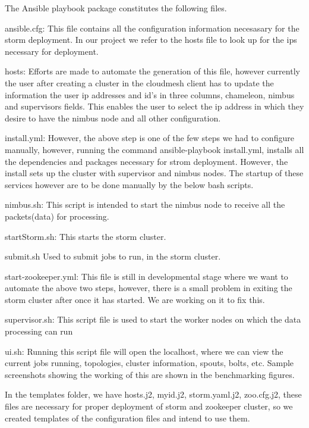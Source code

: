 \documentclass[9pt,twocolumn,twoside]{../../styles/osajnl}
\begin{document}
The Ansible playbook package constitutes the following files.
\begin{description}
\item ansible.cfg: This file contains all the configuration
  information necesasary for the storm deployment. In our project we
  refer to the hosts file to look up for the ips necessary for
  deployment.
  
\item hosts: Efforts are made to automate the generation of this file,
  however currently the user after creating a cluster in the cloudmesh
  client has to update the information the user ip addresses and id's
  in three columns, chameleon, nimbus and supervisors fields. This
  enables the user to select the ip address in which they desire to
  have the nimbus node and all other configuration.

\item install.yml: However, the above step is one of the few steps we
  had to configure manually, however, running the command
  ansible-playbook install.yml, installs all the dependencies and
  packages necessary for strom deployment. However, the install sets
  up the cluster with supervisor and nimbus nodes. The startup of
  these services however are to be done manually by the below bash
  scripts.

\item nimbus.sh: This script is intended to start the nimbus node to
  receive all the packets(data) for processing.
\item startStorm.sh: This starts the storm cluster.
\item submit.sh Used to submit jobs to run, in the storm cluster.
\item start-zookeeper.yml: This file is still in developmental stage
  where we want to automate the above two steps, however, there is a
  small problem in exiting the storm cluster after once it has
  started. We are working on it to fix this.
\item supervisor.sh: This script file is used to start the worker
  nodes on which the data processing can run
\item ui.sh: Running this script file will open the localhost, where
  we can view the current jobs running, topologies, cluster
  information, spouts, bolts, etc. Sample screenshots showing the
  working of this are shown in the benchmarking figures.
\item In the templates folder, we have hosts.j2, myid.j2,
  storm.yaml.j2, zoo.cfg.j2, these files are necessary for proper
  deployment of storm and zookeeper cluster, so we created templates
  of the configuration files and intend to use them.
\end{description}  
\end{document}

